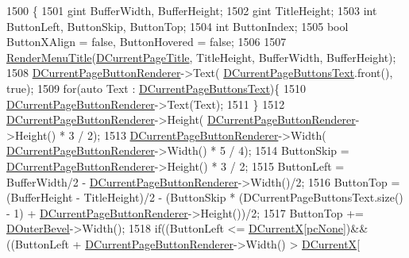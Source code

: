 \begin{DoxyCode}
1500                                            \{
1501     gint BufferWidth, BufferHeight;
1502     gint TitleHeight;
1503     \textcolor{keywordtype}{int} ButtonLeft, ButtonSkip, ButtonTop;
1504     \textcolor{keywordtype}{int} ButtonIndex;
1505     \textcolor{keywordtype}{bool} ButtonXAlign = \textcolor{keyword}{false}, ButtonHovered = \textcolor{keyword}{false};
1506 
1507     \hyperlink{classCApplicationData_a548c5924a281c7e226fd7cac44e59920}{RenderMenuTitle}(\hyperlink{classCApplicationData_a49ce7f0b5891f0f2c29b73aad636b761}{DCurrentPageTitle}, TitleHeight, BufferWidth, 
      BufferHeight); 
1508     \hyperlink{classCApplicationData_abfe1743f2634b069ccc811db4a8733a8}{DCurrentPageButtonRenderer}->Text(
      \hyperlink{classCApplicationData_af04b7f5f8ba4e5c99c0a3530055fc15d}{DCurrentPageButtonsText}.front(), \textcolor{keyword}{true});   
1509     \textcolor{keywordflow}{for}(\textcolor{keyword}{auto} Text : \hyperlink{classCApplicationData_af04b7f5f8ba4e5c99c0a3530055fc15d}{DCurrentPageButtonsText})\{
1510         \hyperlink{classCApplicationData_abfe1743f2634b069ccc811db4a8733a8}{DCurrentPageButtonRenderer}->Text(Text);
1511     \}
1512     \hyperlink{classCApplicationData_abfe1743f2634b069ccc811db4a8733a8}{DCurrentPageButtonRenderer}->Height(
      \hyperlink{classCApplicationData_abfe1743f2634b069ccc811db4a8733a8}{DCurrentPageButtonRenderer}->Height() * 3 / 2);
1513     \hyperlink{classCApplicationData_abfe1743f2634b069ccc811db4a8733a8}{DCurrentPageButtonRenderer}->Width(
      \hyperlink{classCApplicationData_abfe1743f2634b069ccc811db4a8733a8}{DCurrentPageButtonRenderer}->Width() * 5 / 4);
1514     ButtonSkip = \hyperlink{classCApplicationData_abfe1743f2634b069ccc811db4a8733a8}{DCurrentPageButtonRenderer}->Height() * 3 / 2;
1515     ButtonLeft = BufferWidth/2 - \hyperlink{classCApplicationData_abfe1743f2634b069ccc811db4a8733a8}{DCurrentPageButtonRenderer}->Width()/2;
1516     ButtonTop = (BufferHeight - TitleHeight)/2 - (ButtonSkip * (DCurrentPageButtonsText.size() - 1) + 
      \hyperlink{classCApplicationData_abfe1743f2634b069ccc811db4a8733a8}{DCurrentPageButtonRenderer}->Height())/2;
1517     ButtonTop += \hyperlink{classCApplicationData_abc2b04aa05148da81145ff6d6bc2bf01}{DOuterBevel}->Width();
1518     \textcolor{keywordflow}{if}((ButtonLeft <= \hyperlink{classCApplicationData_a1dc7ee482a39f7978c71365ac540f97a}{DCurrentX}[\hyperlink{GameDataTypes_8h_aafb0ca75933357ff28a6d7efbdd7602fa88767aa8e02c7b3192bbab4127b3d729}{pcNone}])&&((ButtonLeft + 
      \hyperlink{classCApplicationData_abfe1743f2634b069ccc811db4a8733a8}{DCurrentPageButtonRenderer}->Width() > \hyperlink{classCApplicationData_a1dc7ee482a39f7978c71365ac540f97a}{DCurrentX}[

\end{DoxyCode}
